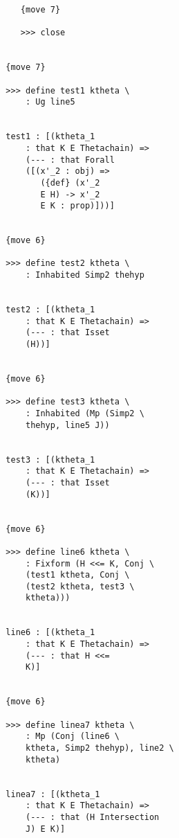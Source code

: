 \documentclass[12pt]{article}
\begin{document}
\begin{verbatim}
                        {move 7}

                        >>> close


                     {move 7}

                     >>> define test1 ktheta \
                         : Ug line5


                     test1 : [(ktheta_1 
                         : that K E Thetachain) => 
                         (--- : that Forall 
                         ([(x'_2 : obj) => 
                            ({def} (x'_2 
                            E H) -> x'_2 
                            E K : prop)]))]


                     {move 6}

                     >>> define test2 ktheta \
                         : Inhabited Simp2 thehyp


                     test2 : [(ktheta_1 
                         : that K E Thetachain) => 
                         (--- : that Isset 
                         (H))]


                     {move 6}

                     >>> define test3 ktheta \
                         : Inhabited (Mp (Simp2 \
                         thehyp, line5 J))


                     test3 : [(ktheta_1 
                         : that K E Thetachain) => 
                         (--- : that Isset 
                         (K))]


                     {move 6}

                     >>> define line6 ktheta \
                         : Fixform (H <<= K, Conj \
                         (test1 ktheta, Conj \
                         (test2 ktheta, test3 \
                         ktheta)))


                     line6 : [(ktheta_1 
                         : that K E Thetachain) => 
                         (--- : that H <<= 
                         K)]


                     {move 6}

                     >>> define linea7 ktheta \
                         : Mp (Conj (line6 \
                         ktheta, Simp2 thehyp), line2 \
                         ktheta)


                     linea7 : [(ktheta_1 
                         : that K E Thetachain) => 
                         (--- : that (H Intersection 
                         J) E K)]



\end{verbatim}
\end{document}
